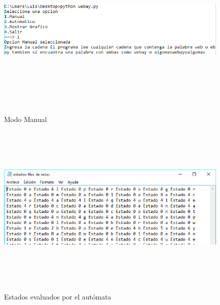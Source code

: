 \documentclass[12pt]{article}
\begin{document}
\begin{figure}[H]
\begin{center}
\includegraphics[width=\textwidth, height=8cm]{manual_webay}
\label{fig:auto_webay}
\caption{Modo Manual}
\end{center}
\end{figure}


\begin{figure}[H]
\begin{center}
\includegraphics[width=\textwidth, height=8cm]{manual_webay_estados}
\label{ }
\caption{Estados evaluados por el autómata}
\end{center}
\end{figure}
\end{document}
